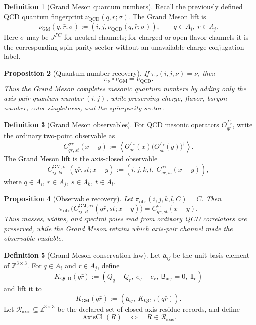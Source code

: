 \documentclass[11pt]{article}
\theoremstyle{definition}
\newtheorem{definition}{Definition}
\theoremstyle{plain}
\newtheorem{proposition}[definition]{Proposition}
\DeclareMathOperator{\AxisCl}{AxisCl}
\begin{document}
\begin{definition}[Grand Meson quantum numbers]
Recall the previously defined QCD quantum fingerprint
\(\nu_{\mathrm{QCD}}(q,\bar r;\sigma)\).
The Grand Meson lift is
\[
  \nu_{\mathrm{GM}}(q,\bar r;\sigma)
  :=
  (i,j,\nu_{\mathrm{QCD}}(q,\bar r;\sigma)),
  \qquad q\in A_i,\ r\in A_j .
\]
Here \(\sigma\) may be \(J^{PC}\) for neutral channels; for charged or
open-flavor channels it is the corresponding spin-parity sector without an
unavailable charge-conjugation label.
\end{definition}

\begin{proposition}[Quantum-number recovery]
If \(\pi_\nu(i,j,\nu)=\nu\), then
\[
  \pi_\nu\circ\nu_{\mathrm{GM}}
  =
  \nu_{\mathrm{QCD}}.
\]
Thus the Grand Meson completes mesonic quantum numbers by adding only
the axis-pair quantum number \((i,j)\), while preserving charge, flavor,
baryon number, color singletness, and the spin-parity sector.
\end{proposition}

\begin{definition}[Grand Meson observables]
For QCD mesonic operators \(O^{\Gamma_\sigma}_{q\bar r}\), write the
ordinary two-point observable as
\[
  C^{\sigma\tau}_{q\bar r,s\bar t}(x-y)
  :=
  \left\langle
  O^{\Gamma_\sigma}_{q\bar r}(x)
  \bigl(O^{\Gamma_\tau}_{s\bar t}(y)\bigr)^{\dagger}
  \right\rangle .
\]
The Grand Meson lift is the axis-closed observable
\[
  C^{\mathrm{GM},\sigma\tau}_{ij,kl}(q\bar r,s\bar t;x-y)
  :=
  (i,j,k,l,\ C^{\sigma\tau}_{q\bar r,s\bar t}(x-y)),
\]
where \(q\in A_i,\ r\in A_j,\ s\in A_k,\ t\in A_l\).
\end{definition}

\begin{proposition}[Observable recovery]
Let \(\pi_{\mathrm{obs}}(i,j,k,l,C)=C\).  Then
\[
  \pi_{\mathrm{obs}}
  \bigl(C^{\mathrm{GM},\sigma\tau}_{ij,kl}(q\bar r,s\bar t;x-y)\bigr)
  =
  C^{\sigma\tau}_{q\bar r,s\bar t}(x-y).
\]
Thus masses, widths, and spectral poles read from ordinary QCD correlators
are preserved, while the Grand Meson retains which axis-pair channel made
the observable readable.
\end{proposition}

\begin{definition}[Grand Meson conservation law]
Let \(\mathbf a_{ij}\) be the unit basis element of
\(\mathbb Z^{3\times3}\).  For \(q\in A_i\) and \(r\in A_j\), define
\[
  K_{\mathrm{QCD}}(q\bar r)
  :=
  (Q_q-Q_r,\ e_q-e_r,\ \mathsf B_{\mathrm{ary}}=0,\
  \mathbf 1_{\mathrm c})
\]
and lift it to
\[
  K_{\mathrm{GM}}(q\bar r)
  :=
  (\mathbf a_{ij},\ K_{\mathrm{QCD}}(q\bar r)).
\]
Let \(\mathcal R_{\mathrm{axis}}\subseteq\mathbb Z^{3\times3}\) be the
declared set of closed axis-residue records, and define
\[
  \AxisCl(R)
  \quad\Longleftrightarrow\quad
  R\in\mathcal R_{\mathrm{axis}}.
\]
\end{definition}
\end{document}
